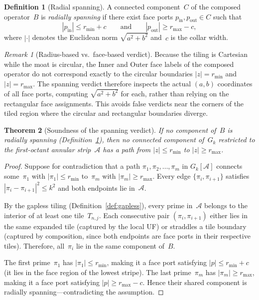 \documentclass[11pt,a4paper]{article}
\newcommand{\Gk}{G_k}
\theoremstyle{definition}
\newtheorem{definition}{Definition}[section]
\theoremstyle{plain}
\newtheorem{theorem}{Theorem}[section]
\theoremstyle{remark}
\newtheorem{remark}[theorem]{Remark}
\begin{document}
\begin{definition}[Radial spanning]\label{def:radial-spanning}
A connected component~$C$ of the composed operator~$B$ is \emph{radially spanning} if there exist face ports $p_{\text{in}}, p_{\text{out}} \in C$ such that
\[
  |p_{\text{in}}| \le r_{\min} + c \qquad \text{and} \qquad |p_{\text{out}}| \ge r_{\max} - c,
\]
where $|\cdot|$ denotes the Euclidean norm $\sqrt{a^2 + b^2}$ and~$c$ is the collar width.
\end{definition}

\begin{remark}[Radius-based vs.\ face-based verdict]\label{rem:radius-verdict}
Because the tiling is Cartesian while the moat is circular, the Inner and Outer face labels of the composed operator do not correspond exactly to the circular boundaries $|z| = r_{\min}$ and $|z| = r_{\max}$.  The spanning verdict therefore inspects the actual $(a, b)$ coordinates of all face ports, computing $\sqrt{a^2 + b^2}$ for each, rather than relying on the rectangular face assignments.  This avoids false verdicts near the corners of the tiled region where the circular and rectangular boundaries diverge.
\end{remark}

\begin{theorem}[Soundness of the spanning verdict]\label{thm:fs-soundness}
If no component of~$B$ is radially spanning (Definition~\ref{def:radial-spanning}), then no connected component of~$\Gk$ restricted to the first-octant annular strip~$\mathcal{A}$ has a path from $|z| \le r_{\min}$ to $|z| \ge r_{\max}$.
\end{theorem}

\begin{proof}
Suppose for contradiction that a path $\pi_1, \pi_2, \ldots, \pi_m$ in $\Gk[\mathcal{A}]$ connects some~$\pi_1$ with $|\pi_1| \le r_{\min}$ to~$\pi_m$ with $|\pi_m| \ge r_{\max}$.  Every edge $\{\pi_i, \pi_{i+1}\}$ satisfies $|\pi_i - \pi_{i+1}|^2 \le k^2$ and both endpoints lie in~$\mathcal{A}$.

By the gapless tiling (Definition~\ref{def:gapless}), every prime in~$\mathcal{A}$ belongs to the interior of at least one tile~$T_{n,j}$.  Each consecutive pair $(\pi_i, \pi_{i+1})$ either lies in the same expanded tile (captured by the local UF) or straddles a tile boundary (captured by composition, since both endpoints are face ports in their respective tiles).  Therefore, all~$\pi_i$ lie in the same component of~$B$.

The first prime~$\pi_1$ has $|\pi_1| \le r_{\min}$, making it a face port satisfying $|p| \le r_{\min} + c$ (it lies in the face region of the lowest stripe).  The last prime~$\pi_m$ has $|\pi_m| \ge r_{\max}$, making it a face port satisfying $|p| \ge r_{\max} - c$.  Hence their shared component is radially spanning---contradicting the assumption.
\end{proof}
\end{document}
